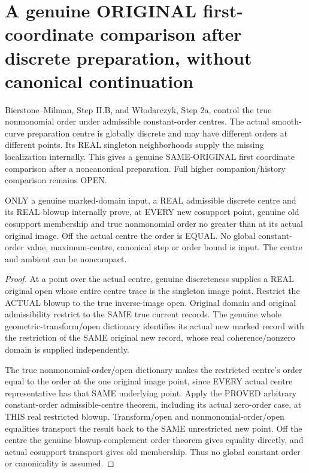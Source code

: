 \section{A genuine ORIGINAL first-coordinate comparison after discrete preparation, without canonical continuation}

Bierstone--Milman\cite{bierstone-milman08-functoriality}, Step II.B, and
W\l odarczyk\cite{wlodarczyk05-hironaka}, Step 2a, control the true
nonmonomial order under admissible constant-order centres. The actual
smooth-curve preparation centre is globally discrete and may have different
orders at different points. Its REAL singleton neighborhoods supply the
missing localization internally. This gives a genuine SAME-ORIGINAL first
coordinate comparison after a noncanonical preparation. Full higher
companion/history comparison remains OPEN.

\begin{lemma}
\label{hir:actual-discrete-preparation-nonmonomial-order-nonincrease}
\leanok
ONLY a genuine marked-domain input, a REAL admissible discrete centre and
its REAL blowup internally prove, at EVERY new cosupport point, genuine
old cosupport membership and true nonmonomial order no greater than at its
actual original image. Off the actual centre the order is EQUAL. No global
constant-order value, maximum-centre, canonical step or order bound is input.
The centre and ambient can be noncompact.
\end{lemma}
\begin{proof}
At a point over the actual centre, genuine discreteness supplies a REAL
original open whose entire centre trace is the singleton image point.
Restrict the ACTUAL blowup to the true inverse-image open. Original domain
and original admissibility restrict to the SAME true current records.
The genuine whole geometric-transform/open dictionary identifies its
actual new marked record with the restriction of the SAME original new
record, whose real coherence/nonzero domain is supplied independently.

The true nonmonomial-order/open dictionary makes the restricted centre's
order equal to the order at the one original image point, since EVERY
actual centre representative has that SAME underlying point. Apply the
PROVED arbitrary constant-order admissible-centre theorem, including its
actual zero-order case, at THIS real restricted blowup. Transform/open
and nonmonomial-order/open equalities transport the result back to the
SAME unrestricted new point. Off the centre the genuine blowup-complement
order theorem gives equality directly, and actual cosupport transport gives
old membership. Thus no global constant order or canonicality is assumed.
\end{proof}

